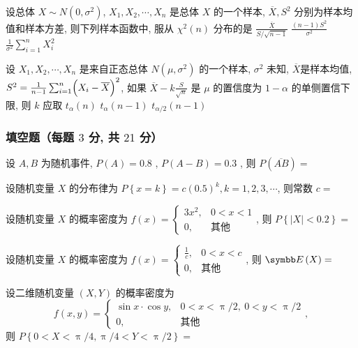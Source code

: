 \begin{ti}
	设总体 $X\sim N\left(0,\sigma^2\right)$, $X_1,X_2,\cdots,X_n$ 是总体 $X$ 的一个样本, $\overline{X},S^2$ 分别为样本均值和样本方差, 则下列样本函数中, 服从 $\chi^2(n)$ 分布的是 \kuo{}
	{$\frac{\overline{X}}{S/\sqrt{n-1}}$}
	{$\frac{(n-1)S^2}{\sigma^2}$}
	{$\frac{1}{\sigma^2}\sum_{i=1}^{n}X_i^2$}
\end{ti}

\begin{ti}
	设 $X_1,X_2,\cdots,X_n$ 是来自正态总体 $N\left(\mu,\sigma^2\right)$ 的一个样本, $\sigma^2$ 未知, $\overline{X}$是样本均值, $S^2=\frac{1}{n-1}\sum_{i=1}^{n}\Bigl(X_i-\overline{X}\Bigr)^2$, 如果 $\overline{X}-k\frac{S}{\sqrt{n}}$ 是 $\mu$ 的置信度为 $1-\alpha$ 的单侧置信下限, 则 $k$ 应取 \kuo{}
	{$t_{\alpha}(n)$}
	{$t_{\alpha}(n-1)$}
	{$t_{\alpha/2}(n-1)$}
\end{ti}

\subsubsection{填空题（每题 $3$ 分, 共 $21$ 分）}
\begin{ti}
	设 $A,B$ 为随机事件, $P(A)=0.8$ , $P(A-B)=0.3$ , 则 $P\left(\overline{AB}\right)=$ \hua{}
\end{ti}

\begin{ti}
	设随机变量 $X$ 的分布律为 $P\left\{x=k\right\}=c(0.5)^k,k=1,2,3,\cdots$, 则常数 $c=$ \hua{}
\end{ti}

\begin{ti}
	设随机变量 $X$ 的概率密度为 $f(x)=
	\begin{cases}
	3x^2, & 0<x<1\\
	0, & \text{其他}
	\end{cases}
	$, 则 $P\left\{\left|X\right|<0.2\right\}=$ \hua{}
\end{ti}

\begin{ti}
	设随机变量 $X$ 的概率密度为 $f(x)=
	\begin{cases}
	\frac{1}{c}, & 0<x<c\\
	0, & \text{其他}
	\end{cases}
	$, 则 $\EE(X)=$ \hua{}
\end{ti}

\begin{ti}
	设二维随机变量 $(X,Y)$ 的概率密度为
	\begin{equation*}
		f(x,y)=
		\begin{cases}
		\sin x\cdot\cos y, & 0<x<\uppi/2,\ 0<y<\uppi/2\\
		0, & \text{其他}
		\end{cases},
	\end{equation*}
	则 $P\left\{0<X<\uppi/4,\uppi/4<Y<\uppi/2\right\}=$ \hua{}
\end{ti}

